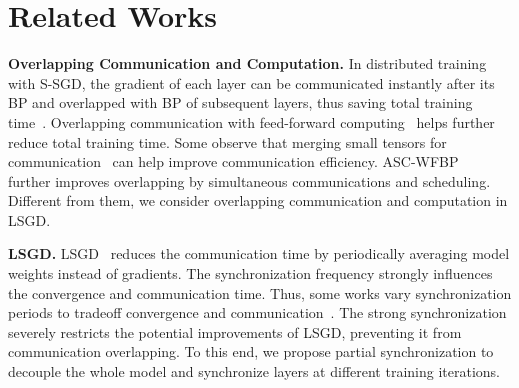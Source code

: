 \section{Related Works}
\label{sec:related}


\textbf{Overlapping Communication and Computation.}
In distributed training with S-SGD, the gradient of each layer can be communicated instantly after its BP and overlapped with BP of subsequent layers, thus saving total training time~\cite{203269}. Overlapping communication with feed-forward computing~\cite{10.1145/3341301.3359642} helps further reduce total training time. Some observe that merging small tensors for communication~\cite{9155269} can help improve communication efficiency. ASC-WFBP~\cite{9488803} further improves overlapping by simultaneous communications and scheduling. Different from them, we consider overlapping communication and computation in LSGD.


\textbf{LSGD.}
LSGD~\cite{stich2018localsgd,woodworth2020minibatch,AperiodcLocalSGD,sadiev2022communication} reduces the communication time by periodically averaging model weights instead of gradients. The synchronization frequency strongly influences the convergence and communication time. Thus, some works vary synchronization periods to tradeoff convergence and communication~\cite{stich2018localsgd,AperiodcLocalSGD,wang2019adaptive}. The strong synchronization severely restricts the potential improvements of LSGD, preventing it from communication overlapping. To this end, we propose partial synchronization to decouple the whole model and synchronize layers at different training iterations.

